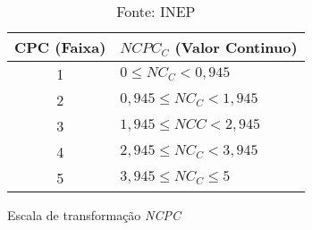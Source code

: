 \begin{table}[!htbp]
\centering
\begin{tabular}{@{}cl@{}}
\toprule
CPC (Faixa) & $NCPC_{C}$  (Valor Continuo) \\ \midrule
1           & $0 \leq NC_{C} < 0,945$      \\
2           & $0,945 \leq NC_{C}< 1,945$   \\
3           & $1,945 \leq NCC < 2,945$     \\
4           & $2,945 \leq NC_{C} < 3,945$  \\
5           & $3,945 \leq NC_{C} \leq 5$   \\ \bottomrule
\end{tabular}
\caption{Escala de transformação \textit{NCPC}}
\caption*{Fonte: INEP}
\label{tbl: escala-cpc}
\end{table}
